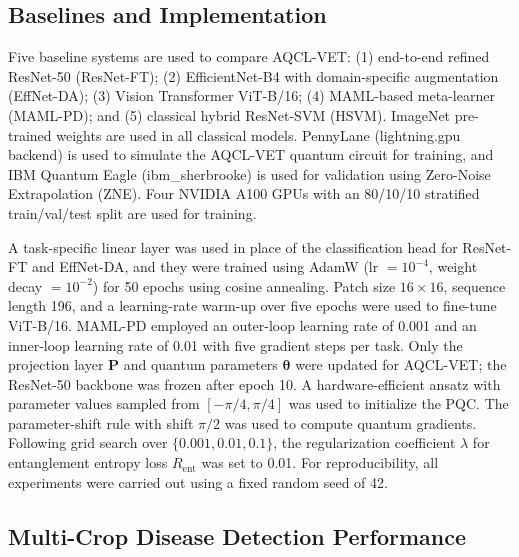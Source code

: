 \documentclass[conference]{IEEEtran}
\begin{document}
\subsection{Baselines and Implementation}

Five baseline systems are used to compare AQCL-VET: (1) end-to-end refined ResNet-50 (ResNet-FT); (2) EfficientNet-B4 with domain-specific augmentation (EffNet-DA); (3) Vision Transformer ViT-B/16; (4) MAML-based meta-learner (MAML-PD); and (5) classical hybrid ResNet-SVM (HSVM). ImageNet pre-trained weights are used in all classical models. PennyLane (lightning.gpu backend) is used to simulate the AQCL-VET quantum circuit for training, and IBM Quantum Eagle (ibm\_sherbrooke) is used for validation using Zero-Noise Extrapolation (ZNE). Four NVIDIA A100 GPUs with an 80/10/10 stratified train/val/test split are used for training.

A task-specific linear layer was used in place of the classification head for ResNet-FT and EffNet-DA, and they were trained using AdamW (lr $= 10^{-4}$, weight decay $= 10^{-2}$) for 50 epochs using cosine annealing. Patch size $16\times16$, sequence length 196, and a learning-rate warm-up over five epochs were used to fine-tune ViT-B/16. MAML-PD employed an outer-loop learning rate of 0.001 and an inner-loop learning rate of 0.01 with five gradient steps per task. Only the projection layer $\mathbf{P}$ and quantum parameters $\boldsymbol{\theta}$ were updated for AQCL-VET; the ResNet-50 backbone was frozen after epoch 10. A hardware-efficient ansatz with parameter values sampled from $[-\pi/4, \pi/4]$ was used to initialize the PQC. The parameter-shift rule with shift $\pi/2$ was used to compute quantum gradients. Following grid search over $\{0.001, 0.01, 0.1\}$, the regularization coefficient $\lambda$ for entanglement entropy loss $R_\text{ent}$ was set to 0.01. For reproducibility, all experiments were carried out using a fixed random seed of 42.

\subsection{Multi-Crop Disease Detection Performance}
\end{document}
